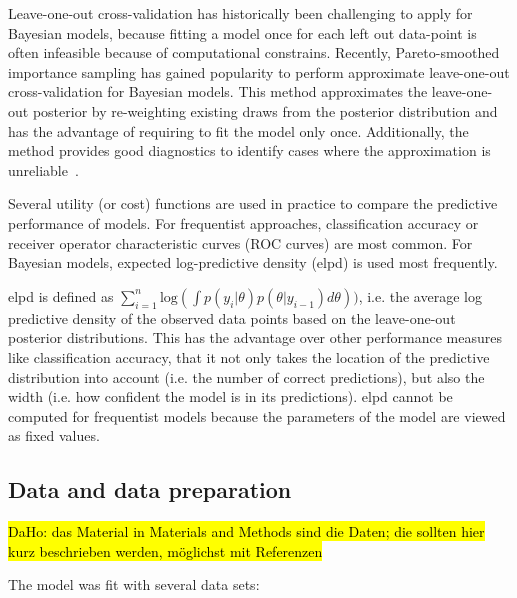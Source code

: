 \documentclass{bioinfo}
\begin{document}
\begin{methods}
  Leave-one-out cross-validation has historically been challenging to apply for Bayesian models, because fitting a model once for each left out data-point is often infeasible because of computational constrains.
  Recently, Pareto-smoothed importance sampling has gained popularity to perform approximate leave-one-out cross-validation for Bayesian models. This method  approximates the leave-one-out posterior by re-weighting existing draws from the posterior distribution and has the advantage of requiring to fit the model only once. Additionally, the method provides good diagnostics to identify cases where the approximation is unreliable~\cite{Vehtari2016}.

  Several utility (or cost) functions are used in practice to compare the predictive performance of models. For frequentist approaches, classification accuracy or receiver operator characteristic curves (ROC curves) are most common.
  For Bayesian models, expected log-predictive density (elpd) is used most frequently. 

  elpd is defined as \(\sum_{i=1}^{n}\text{log}(\int p(y_i|\theta)p(\theta|y_{i-1})d\theta))\), i.e. the average log predictive density of the observed data points based on the leave-one-out posterior distributions.
  This has the advantage over other performance measures like classification accuracy, that it not only takes the location of the predictive distribution into account (i.e. the number of correct predictions), but also the width (i.e. how confident the model is in its predictions).
  elpd cannot be computed for frequentist models because the parameters of the model are viewed as fixed values.

  \subsection{Data and data preparation}
 \hl{DaHo: das Material in Materials and Methods sind die Daten; die sollten hier kurz beschrieben werden, möglichst mit Referenzen}

The model was fit with several data sets:


\end{methods}
\end{document}
